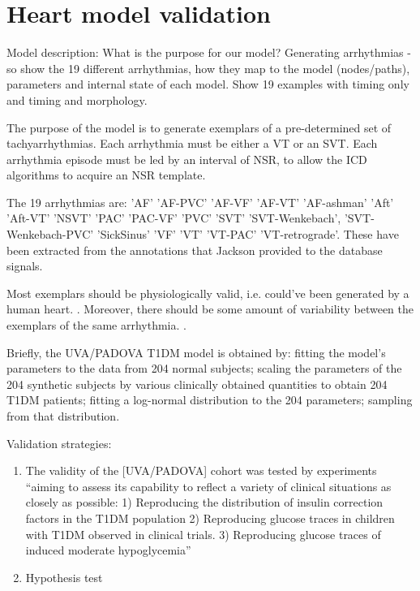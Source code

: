 \section{Heart model validation}
\label{sec:heart model validation}

Model description: What is the purpose for our model? Generating arrhythmias - so show the 19 different arrhythmias, how they map to the model (nodes/paths), parameters and internal state of each model. Show 19 examples with timing only and timing and morphology. 

The purpose of the model is to generate exemplars of a pre-determined set of tachyarrhythmias.
Each arrhythmia must be either a VT or an SVT.
Each arrhythmia episode must be led by an interval of NSR, to allow the ICD algorithms to acquire an NSR template.

The 19 arrhythmias are:
'AF'    'AF-PVC'    'AF-VF'    'AF-VT'    'AF-ashman'    'Aft'    'Aft-VT'    'NSVT'    'PAC'    'PAC-VF'    'PVC'    'SVT'    'SVT-Wenkebach', 'SVT-Wenkebach-PVC'    'SickSinus'    'VF'    'VT'    'VT-PAC'    'VT-retrograde'.
These have been extracted from the annotations that Jackson provided to the database signals.

Most exemplars should be physiologically valid, i.e. could've been generated by a human heart.
. 
Moreover, there should be some amount of variability between the exemplars of the same arrhythmia.
.


Briefly, the UVA/PADOVA T1DM model is obtained by: fitting the model's parameters to the data from 204 normal subjects;
scaling the parameters of the 204 synthetic subjects by various clinically obtained quantities to obtain 204 T1DM patients;
fitting a log-normal distribution to the 204 parameters;
sampling from that distribution.

Validation strategies:
\begin{enumerate}
	\item The validity of the [UVA/PADOVA] cohort was tested by experiments “aiming to assess its capability to reflect a variety of clinical situations as closely as possible: 1) Reproducing the distribution of insulin correction factors in the T1DM population  2) Reproducing glucose traces in children with T1DM observed in clinical trials. 3) Reproducing glucose traces of induced moderate hypoglycemia”
	\item Hypothesis test
\end{enumerate}
